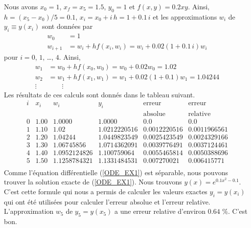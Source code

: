 {\begin{egg}
Nous avons $x_0=1$, $x_f= x_5 = 1.5$, $y_0 = 1$ et $f(x,y) = 0.2xy$.  Ainsi,
$h = (x_5-x_0)/5 = 0.1$, $x_i = x_0 + i\,h =1 + 0.1\,i$ et les
approximations $w_i$ de $y_i \equiv y(x_i)$ sont données par
\begin{align*}
w_0 & = 1 \\
w_{i+1} & = w_i + h f(x_i, w_i) = w_i + 0.02 (1+0.1\,i) w_i
\end{align*}
pour $i=0$, $1$, \ldots, $4$.  Ainsi,
\begin{align*}
 w_1 &= w_0 + h f(x_0, w_0) =  w_0 + 0.02 w_0 = 1.02 \\
 w_2 &= w_1 + h f(x_1, w_1) =  w_1 + 0.02 (1 + 0.1) w_1 = 1.04244 \\
  \vdots & \qquad \vdots
\end{align*}
Les résultats de ces calculs sont donnés dans le tableau suivant.
\[
\begin{array}{c|l|l|l|l|l}
i & x_i & w_i & y_i & \text{erreur} & \text{erreur} \\
  & & & & \text{absolue} & \text{relative} \\
\hline
0 & 1.00 & 1.0000 & 1.0000 & 0.0 & 0.0 \\
1 & 1.10 & 1.02 & 1.0212220516 & 0.0012220516 & 0.0011966561 \\
2 & 1.20 & 1.04244 & 1.0449823549 & 0.0025423549 & 0.0024329166 \\
3 & 1.30 & 1.06745856 & 1.0714362091 & 0.0039776491 & 0.0037124461 \\
4 & 1.40 & 1.0952124826 & 1.100759064 & 0.0055465814 & 0.0050388696 \\
5 & 1.50 & 1.1258784321 & 1.1331484531 & 0.007270021 & 0.006415771 \\
\end{array}
\]
Comme l'équation différentielle (\ref{ODE_EX1}) est séparable, nous pouvons
trouver la solution exacte de (\ref{ODE_EX1}).  Nous trouvons
$y(x) = e^{0.1x^2 -0.1}$.  C'est cette formule qui nous a permis de
calculer les valeurs exactes $y_i = y(x_i)$ qui ont été utilisées pour
calculer l'erreur absolue et l'erreur relative.  L'approximation $w_5$
de $y_5 = y(x_5)$ a une erreur relative d'environ $0.64$ \%.  C'est
bon.
\end{egg}

}
